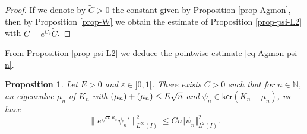 \documentclass[JEP,XML,SOM,Unicode]{cedram}
\theoremstyle{plain}
\newtheorem{proposition}[theorem]{Proposition}
\theoremstyle{definition}
\newcommand{\nr}[1]{\Vert #1\Vert}
\newcommand{\1}{\mathds 1}
\let\Re\relax
\DeclareMathOperator{\Re}{\mathsf{Re}\mkern2mu}
\let\Im\relax
\DeclareMathOperator{\Im}{\mathsf{Im}\mkern2mu}
\renewcommand{\ker}{\mathsf{ker}}
\newcommand{\N}{\mathbb{N}}
\let\e\varepsilon
\let\m\mu
\begin{document}
\begin{proof}
If we denote by $\tilde C > 0$ the constant given by Proposition \ref{prop-Agmon}, then by Proposition \ref{prop-W} we obtain the estimate of Proposition \ref{prop-psi-L2} with $C = e^{C_\e} \tilde C$.
\end{proof}

From Proposition \ref{prop-psi-L2} we deduce the pointwise estimate \eqref{eq-Agmon-psi-n}.

\begin{proposition} \label{prop-psi-Linf}
Let $E > 0$ and $\e \in{}]0,1[$. There exists $C > 0$ such that for $n \in \N$, an eigenvalue $\m_n$ of $K_n$ with $\Re(\m_n) + \Im(\m_n) \leq E \sqrt n$ and $\psi_n \in \ker(K_n-\m_n)$, we have
\[
\big\|e^{\sqrt n\,\kappa_\e} \psi_n'\big\|_{L^\infty(I)}^2 \leq C n \nr{\psi_n}_{L^2(I)}^2.
\]
\end{proposition}
\end{document}
